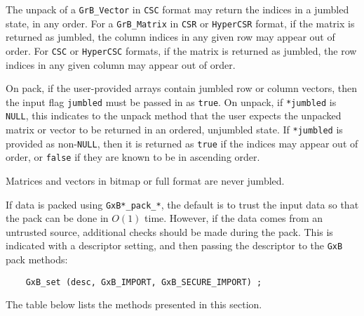 \documentclass[12pt]{article}
\begin{document}
{The unpack of a \verb'GrB_Vector' in \verb'CSC' format may return the
indices in a jumbled state, in any order.
For a \verb'GrB_Matrix' in \verb'CSR' or \verb'HyperCSR' format, if the matrix
is returned as jumbled, the column indices in any given row may appear out of
order.  For \verb'CSC' or \verb'HyperCSC' formats, if the matrix is returned as
jumbled, the row indices in any given column may appear out of order.

On pack, if the user-provided arrays contain jumbled row or column vectors,
then the input flag \verb'jumbled' must be passed in as \verb'true'.  On
unpack, if \verb'*jumbled' is \verb'NULL', this indicates to the unpack method
that the user expects the unpacked matrix or vector to be returned in an
ordered, unjumbled state.  If \verb'*jumbled' is provided as non-\verb'NULL',
then it is returned as \verb'true' if the indices may appear out of order, or
\verb'false' if they are known to be in ascending order.

Matrices and vectors in bitmap or full format are never jumbled.

If data is packed using
\verb'GxB*_pack_*', the default is to trust the input data so that the
pack can be done in $O(1)$ time.  However, if the data comes from an
untrusted source, additional checks should be made during the pack.  This is
indicated with a descriptor setting, and then passing the descriptor
to the \verb'GxB' pack methods:

    {\footnotesize
    \begin{verbatim}
    GxB_set (desc, GxB_IMPORT, GxB_SECURE_IMPORT) ; \end{verbatim}}

The table below lists the methods presented in this section.

}
\end{document}
